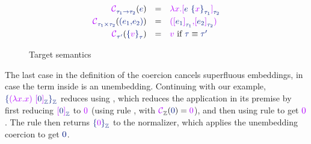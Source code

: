  \begin{figure}
\[
\begin{array}{r l l}
  \tcoerce{\sarrow{\staui}{\stauii}}{\relax}\sexp  & = & 
  \tabs{\tvar{x}}{\talien{\sapp\sexp{\salien{\tvar{x}}{\staui}{\relax}}}{\stauii}{\relax}}
  \\[0.3em]
  \tcoerce{\sprod{\staui}{\stauii}}{\relax}{\spair{\sexpi}{\sexpii}}  & = & 
  \tpair{\talien{\sexpi}{\staui}{\relax}}{\talien{\sexpii}{\stauii}{\relax}}
  \\[0.3em] 
  \tcoerce{\staup}{\relax}{\salien{\tval}{\stau}{\relax}}  & = &  \tval
  \text{ if } \stau \equiv \staup
\end{array}
\]
     \caption{Target semantics}
     \label{fig:targetseman}
 \end{figure}

The last case in the definition of the coercion cancels
 superfluous embeddings, in case the term inside is an
 unembedding. Continuing with our example,
$\salien{\tapp{\target{(}\tabs{\tvar{x}}{\tvar{x}}\target{)}}{\talien{\source{0}}{\mathbb{\source{Z}}}{}}}{\mathbb{\source{Z}}}{}$
 reduces using {}, which reduces the application in its
 premise by first reducing
 $\talien{\source{0}}{\mathbb{\source{Z}}}{}$
 to
$\target{0}$ (using rule {}, with
 $\tcoerce{\mathbb{Z}}{\relax}{\source{0}} = \target{0}$), and
then using rule {} to get
 $\target{0}$. The rule {} then returns
 $\salien{\target{0}}{\mathbb{\source{Z}}}{}$
 to the \fstar normalizer, which applies the unembedding coercion to
 get $\source{0}$.
 
